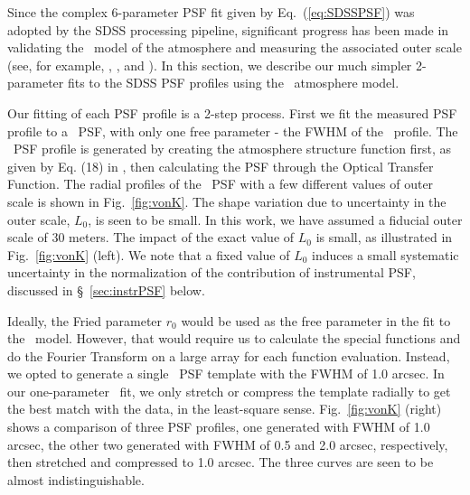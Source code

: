 

Since the complex 6-parameter PSF fit given by Eq.~(\ref{eq:SDSSPSF}) was adopted by 
the SDSS processing pipeline, significant progress has been made in validating the 
\vk~model of the atmosphere and measuring the associated outer
scale (see, for example, \citealt{Tokovinin2002}, \citealt{Boccas2004}, and \citealt{MartinezMessenger}).
In this section, we describe our much simpler 2-parameter fits to the SDSS PSF
profiles using the \vk~atmosphere model.

Our fitting of each PSF profile is a 2-step process. First we fit the
measured PSF profile to a \vk~PSF, with only one free parameter -
the FWHM of the \vk~profile.  The \vk~PSF profile is generated by creating the atmosphere
structure function first, as given by Eq. (18) in \cite{Tokovinin2002}, then calculating the
PSF through the Optical Transfer Function. 
The radial profiles of the \vk~PSF with a few different values of
outer scale is shown in Fig.~\ref{fig:vonK}.
The shape variation due to uncertainty in the outer scale, $L_0$, is seen to
be small. In this work, we have assumed a fiducial outer scale of 30 meters.
The impact of the exact value of $L_0$ is small, as illustrated in
Fig.~\ref{fig:vonK} (left). 
We note that a fixed value of $L_0$ induces a small systematic uncertainty in 
the normalization of the contribution of instrumental PSF, discussed in \S~\ref{sec:instrPSF} 
below. 

Ideally, the Fried parameter $r_0$ would be used as the free
parameter in the fit to the \vk~model. However, 
that would require us to calculate the special functions and do the
Fourier Transform on a large array for each function evaluation.
Instead, we opted to generate a single \vk~PSF template with the FWHM of 
1.0 arcsec. In our one-parameter \vk~fit, we only stretch or compress
the template radially to get the best match with the data, in the
least-square sense.
Fig.~\ref{fig:vonK} (right) shows a comparison of three PSF profiles,
one generated with FWHM of 1.0 arcsec, the other two generated with
FWHM of 0.5 and 2.0 arcsec, respectively, then stretched and
compressed to 1.0 arcsec. The three curves are seen to be almost
indistinguishable.

